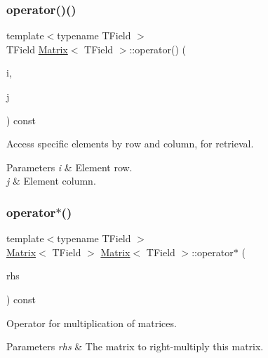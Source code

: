 \subsubsection{\texorpdfstring{operator()()}{operator()()}\hspace{0.1cm}{\footnotesize\ttfamily [2/2]}}
{\footnotesize\ttfamily template$<$typename T\+Field $>$ \\
T\+Field \mbox{\hyperlink{classMatrix}{Matrix}}$<$ T\+Field $>$\+::operator() (\begin{DoxyParamCaption}\item[{const unsigned \&}]{i,  }\item[{const unsigned \&}]{j }\end{DoxyParamCaption}) const}



Access specific elements by row and column, for retrieval. 


\begin{DoxyParams}{Parameters}
{\em i} & Element row. \\
\hline
{\em j} & Element column. \\
\hline
\end{DoxyParams}
\mbox{\label{classMatrix_a76e19b560ed401d2b87f7c275533e9fb}} 
\subsubsection{\texorpdfstring{operator$\ast$()}{operator*()}}
{\footnotesize\ttfamily template$<$typename T\+Field $>$ \\
\mbox{\hyperlink{classMatrix}{Matrix}}$<$ T\+Field $>$ \mbox{\hyperlink{classMatrix}{Matrix}}$<$ T\+Field $>$\+::operator$\ast$ (\begin{DoxyParamCaption}\item[{const \mbox{\hyperlink{classMatrix}{Matrix}}$<$ T\+Field $>$ \&}]{rhs }\end{DoxyParamCaption}) const}



Operator for multiplication of matrices. 


\begin{DoxyParams}{Parameters}
{\em rhs} & The matrix to right-\/multiply this matrix. \\
\hline
\end{DoxyParams}
\mbox{\label{classMatrix_ae8c4a30a41040e1d7ced1d76884e9c63}} 
